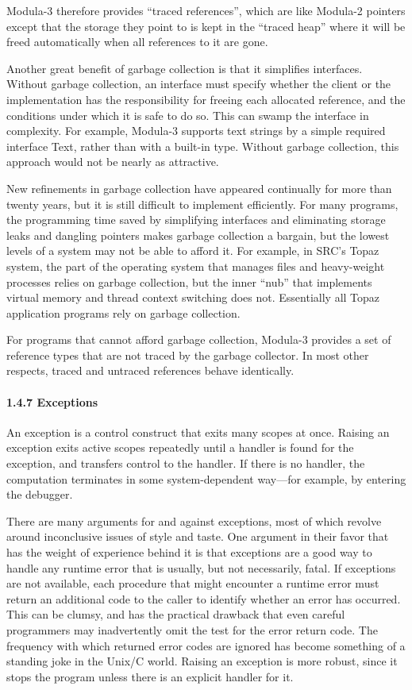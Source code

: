 \documentclass[10pt]{article}
\begin{document}
Modula-3 therefore provides ``traced references'', which are like Modula-2
pointers except that the storage they point to is kept in the ``traced heap''
where it will be freed automatically when all references to it are gone.

Another great benefit of garbage collection is that it simplifies
interfaces.  Without garbage collection, an interface must specify whether the
client or the implementation has the responsibility for freeing each allocated
reference, and the conditions under which it is safe to do so.  This can swamp
the interface in complexity.  For example, Modula-3 supports text strings by a
simple required interface Text, rather than with a built-in type.  Without
garbage collection, this approach would not be nearly as attractive.

New refinements in garbage collection have appeared continually for more than
twenty years, but it is still difficult to implement efficiently.  For many
programs, the programming time saved by simplifying interfaces and eliminating
storage leaks and dangling pointers makes garbage collection a bargain, but
the lowest levels of a system may not be able to afford it.  For example, in
SRC's Topaz system, the part of the operating system that manages files and
heavy-weight processes relies on garbage collection, but the inner ``nub''
that implements virtual memory and thread context switching does
not.  Essentially all Topaz application programs rely on garbage collection.

For programs that cannot afford garbage collection, Modula-3 provides a set of
reference types that are not traced by the garbage collector.  In most other
respects, traced and untraced references behave identically.

\paragraph{1.4.7 Exceptions}

An exception is a control construct that exits many scopes at once.  Raising an
exception exits active scopes repeatedly until a handler is found for the
exception, and transfers control to the handler.  If there is no handler, the
computation terminates in some system-dependent way---for example, by entering
the debugger.

There are many arguments for and against exceptions, most of which revolve
around inconclusive issues of style and taste.  One argument in their favor
that has the weight of experience behind it is that exceptions are a good way
to handle any runtime error that is usually, but not necessarily, fatal.  If
exceptions are not available, each procedure that might encounter a runtime
error must return an additional code to the caller to identify whether an
error has occurred.  This can be clumsy, and has the practical drawback that
even careful programmers may inadvertently omit the test for the error return
code.  The frequency with which returned error codes are ignored has become
something of a standing joke in the Unix/C world.  Raising an exception is more
robust, since it stops the program unless there is an explicit handler for it.
\end{document}
